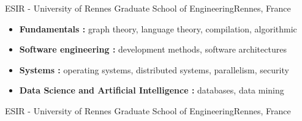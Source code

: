 {ESIR - University of Rennes Graduate School of Engineering}{Rennes, France
}
{
\begin{itemize}
\item \textbf{Fundamentals :} graph theory, language theory, compilation, algorithmic
\item \textbf{Software engineering :} development methods, software architectures
\item \textbf{Systems :} operating systems, distributed systems, parallelism, security
\item \textbf{Data Science and Artificial Intelligence :} databases, data mining
\end{itemize}
}
{ESIR - University of Rennes Graduate School of Engineering}{Rennes, France}